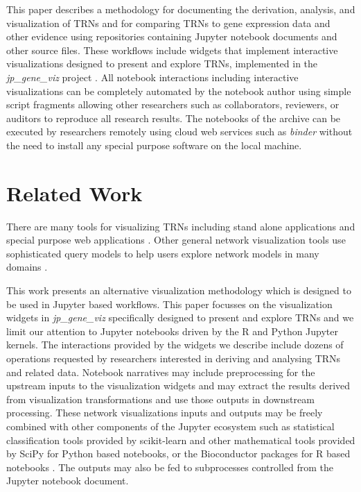\documentclass[10pt,letterpaper]{article}
\begin{document}
This  paper describes a methodology for documenting the derivation, analysis, 
and visualization of TRNs and for comparing TRNs to gene expression data and 
other evidence using repositories containing Jupyter notebook documents 
\cite{ipython} and other source files.  These workflows include widgets that implement 
interactive visualizations designed to present and explore TRNs, implemented in 
the {\em jp\_gene\_viz} project \cite{jpgeneviz}. All notebook interactions including interactive 
visualizations can be completely automated by the notebook author using simple 
script fragments allowing other researchers such as collaborators, reviewers, 
or auditors to reproduce all research results.  The notebooks of the archive 
can be executed by researchers remotely using cloud web services such as {\em binder} \cite{binder} 
without the need to install any special purpose software on the local machine.

\section{Related Work}

There are many tools for visualizing TRNs \cite{VizBi} including 
stand alone applications \cite{Partl, cytoscape, gephi} 
and special purpose web applications \cite{genotet}.  
Other general network visualization tools use sophisticated query 
models to help users explore network models in many domains \cite{Kairam15}.

This work presents an alternative visualization methodology 
which is designed to be used in Jupyter based workflows.  
This paper focusses on the visualization widgets in {\em jp\_gene\_viz} specifically designed to present 
and explore TRNs and we limit our attention to Jupyter notebooks
driven by the R and Python Jupyter kernels.
The interactions provided by the widgets we describe include 
dozens of operations requested by researchers interested in 
deriving and analysing TRNs and related data.  
Notebook narratives may include preprocessing for the upstream inputs 
to the visualization widgets and may extract the results derived 
from visualization transformations and use those outputs in
 downstream processing.  These network visualizations inputs and outputs 
 may be freely combined with other components of the Jupyter 
 ecosystem such as statistical classification tools 
 provided by scikit-learn \cite{scikit-learn} and other 
 mathematical tools provided by SciPy \cite{scipy} for Python based
 notebooks, or the Bioconductor packages for R based notebooks \cite{bioconductor}.
 The outputs may also be 
 fed to subprocesses controlled from the Jupyter notebook document.  
\end{document}
